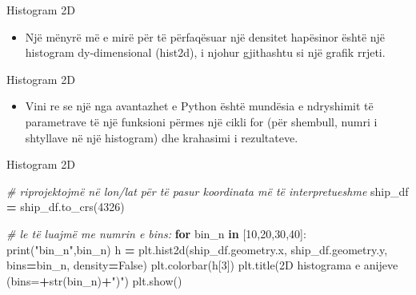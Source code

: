 \documentclass[
  ignorenonframetext,
]{beamer}
\newenvironment{Shaded}{\begin{snugshade}}{\end{snugshade}}
\newcommand{\BuiltInTok}[1]{#1}
\newcommand{\CommentTok}[1]{\textcolor[rgb]{0.56,0.35,0.01}{\textit{#1}}}
\newcommand{\ControlFlowTok}[1]{\textcolor[rgb]{0.13,0.29,0.53}{\textbf{#1}}}
\newcommand{\DecValTok}[1]{\textcolor[rgb]{0.00,0.00,0.81}{#1}}
\newcommand{\KeywordTok}[1]{\textcolor[rgb]{0.13,0.29,0.53}{\textbf{#1}}}
\newcommand{\NormalTok}[1]{#1}
\newcommand{\OperatorTok}[1]{\textcolor[rgb]{0.81,0.36,0.00}{\textbf{#1}}}
\newcommand{\StringTok}[1]{\textcolor[rgb]{0.31,0.60,0.02}{#1}}
\newcommand{\VariableTok}[1]{\textcolor[rgb]{0.00,0.00,0.00}{#1}}
\providecommand{\tightlist}{%
  \setlength{\itemsep}{0pt}\setlength{\parskip}{0pt}}
\begin{document}
\begin{frame}{Histogram 2D}
\protect\hypertarget{histogram-2d}{}
\begin{itemize}
\tightlist
\item
  Një mënyrë më e mirë për të përfaqësuar një densitet hapësinor është
  një histogram dy-dimensional (hist2d), i njohur gjithashtu si një
  grafik rrjeti.
\end{itemize}
\end{frame}

\begin{frame}{Histogram 2D}
\protect\hypertarget{histogram-2d-1}{}
\begin{itemize}
\tightlist
\item
  Vini re se një nga avantazhet e Python është mundësia e ndryshimit të
  parametrave të një funksioni përmes një cikli for (për shembull, numri
  i shtyllave në një histogram) dhe krahasimi i rezultateve.
\end{itemize}
\end{frame}

\begin{frame}[fragile]{Histogram 2D}
\protect\hypertarget{histogram-2d-2}{}

\begin{Shaded}
\begin{Highlighting}[]
\CommentTok{\# riprojektojmë në lon/lat për të pasur koordinata më të interpretueshme}
\NormalTok{ship\_df }\OperatorTok{=}\NormalTok{ ship\_df.to\_crs(}\DecValTok{4326}\NormalTok{)}

\CommentTok{\# le të luajmë me numrin e bins:}
\ControlFlowTok{for}\NormalTok{ bin\_n }\KeywordTok{in}\NormalTok{ [}\DecValTok{10}\NormalTok{,}\DecValTok{20}\NormalTok{,}\DecValTok{30}\NormalTok{,}\DecValTok{40}\NormalTok{]:}
    \BuiltInTok{print}\NormalTok{(}\StringTok{"bin\_n"}\NormalTok{,bin\_n)}
\NormalTok{    h }\OperatorTok{=}\NormalTok{ plt.hist2d(ship\_df.geometry.x, ship\_df.geometry.y, bins}\OperatorTok{=}\NormalTok{bin\_n, density}\OperatorTok{=}\VariableTok{False}\NormalTok{)}
\NormalTok{    plt.colorbar(h[}\DecValTok{3}\NormalTok{])}
\NormalTok{    plt.title(}\StringTok{\textquotesingle{}2D histograma e anijeve (bins=\textquotesingle{}}\OperatorTok{+}\BuiltInTok{str}\NormalTok{(bin\_n)}\OperatorTok{+}\StringTok{")"}\NormalTok{)}
\NormalTok{    plt.show()}
\end{Highlighting}
\end{Shaded}
\end{frame}
\end{document}
